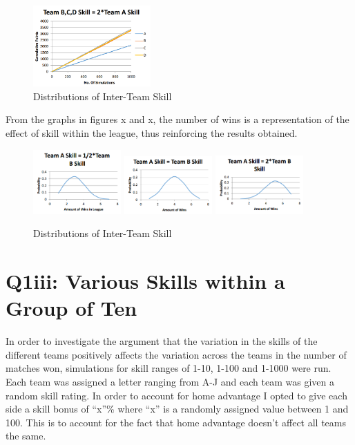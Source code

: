 \documentclass[12pt]{article}
\begin{document}
\begin{figure}[H]
\centering
\includegraphics[width=0.4\textwidth]{twice_skill_a.png}
\caption{Distributions of Inter-Team Skill}
\end{figure}

From the graphs in figures x and x, the number of wins is a representation of the effect of skill within the league, thus reinforcing the results obtained.

\begin{figure}[h]
\centering
\includegraphics[width=0.3\textwidth]{skill_a_half_skill_b.png}
\includegraphics[width=0.3\textwidth]{skill_a_equals_skill_b.png}
\includegraphics[width=0.3\textwidth]{skill_a_2x_skill_b.png}
\caption{Distributions of Inter-Team Skill}
\end{figure}

\section{Q1iii: Various Skills within a Group of Ten}
In order to investigate the argument that the variation in the skills of the different teams positively affects the variation across the teams in the number of matches won, simulations for skill ranges of 1-10, 1-100 and 1-1000 were run. Each team was assigned a letter ranging from A-J and each team was given a random skill rating. In order to account for home advantage I opted to give each side a skill bonus of “x”\% where “x” is a randomly assigned value between 1 and 100. This is to account for the fact that home advantage doesn’t affect all teams the same.
\end{document}
